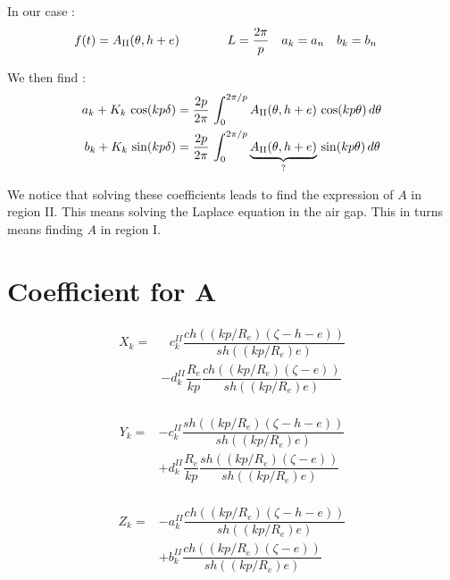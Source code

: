 In our case :
\begin{align*}
f(t) &= A_{\rm II}(\theta,h+e) \hspace{1cm} &
L &= \dfrac{2\pi}{p} &
a_k &= a_n &
b_k &= b_n 
\end{align*}

We then find :
\begin{align*}
a_k + K_k\, \cos(kp\delta) &= \dfrac{2p}{2\pi}\, \int_0^{2\pi/p} A_{\rm II} (\theta,h+e)\, \cos(kp\theta)\, d\theta \\
b_k + K_k\, \sin(kp\delta) &= \dfrac{2p}{2\pi}\, \int_0^{2\pi/p} \underbrace{A_{\rm II} (\theta,h+e)}_{?}\, \sin(kp\theta)\, d\theta 
\end{align*}

We notice that solving these coefficients leads to find the expression of $A$ in region \rm II. This means solving the Laplace equation in the air gap. This in turns means finding $A$ in region \rm I.

\section{Coefficient for \texorpdfstring{$\mathbf{A}$}{A}}

\begin{equation*}
\begin{split} 
X_k = & ~~~ c_k^{II} \dfrac{ch((kp/R_e)(\zeta - h -e))}{sh((kp/R_e)e)} \\ & - d_k^{II}\dfrac{R_e}{kp}\dfrac{ch((kp/R_e)(\zeta -e))}{sh((kp/R_e)e)} \\
\end{split}
\end{equation*}

\begin{equation*}
\begin{split} 
Y_k = & - c_k^{II} \dfrac{sh((kp/R_e)(\zeta - h -e))}{sh((kp/R_e)e)} \\ & + d_k^{II}\dfrac{R_e}{kp}\dfrac{sh((kp/R_e)(\zeta -e))}{sh((kp/R_e)e)} \\
\end{split}
\end{equation*}

\begin{equation*}
\begin{split} 
Z_k = & - a_k^{II} \dfrac{ch((kp/R_e)(\zeta - h -e))}{sh((kp/R_e)e)} \\ & + b_k^{II}\dfrac{ch((kp/R_e)(\zeta -e))}{sh((kp/R_e)e)} \\
\end{split}
\end{equation*}

